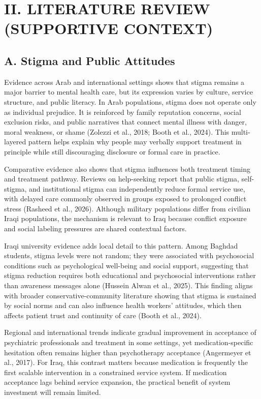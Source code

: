 \section{II. LITERATURE REVIEW (SUPPORTIVE
CONTEXT)}\label{ii.-literature-review-supportive-context}

\subsection{A. Stigma and Public
Attitudes}\label{a.-stigma-and-public-attitudes}

Evidence across Arab and international settings shows that stigma
remains a major barrier to mental health care, but its expression varies
by culture, service structure, and public literacy. In Arab populations,
stigma does not operate only as individual prejudice. It is reinforced
by family reputation concerns, social exclusion risks, and public
narratives that connect mental illness with danger, moral weakness, or
shame (Zolezzi et al., 2018; Booth et al., 2024). This multi-layered
pattern helps explain why people may verbally support treatment in
principle while still discouraging disclosure or formal care in
practice.

Comparative evidence also shows that stigma influences both treatment
timing and treatment pathway. Reviews on help-seeking report that public
stigma, self-stigma, and institutional stigma can independently reduce
formal service use, with delayed care commonly observed in groups
exposed to prolonged conflict stress (Rasheed et al., 2026). Although
military populations differ from civilian Iraqi populations, the
mechanism is relevant to Iraq because conflict exposure and social
labeling pressures are shared contextual factors.

Iraqi university evidence adds local detail to this pattern. Among
Baghdad students, stigma levels were not random; they were associated
with psychosocial conditions such as psychological well-being and social
support, suggesting that stigma reduction requires both educational and
psychosocial interventions rather than awareness messages alone (Hussein
Alwan et al., 2025). This finding aligns with broader
conservative-community literature showing that stigma is sustained by
social norms and can also influence health workers' attitudes, which
then affects patient trust and continuity of care (Booth et al., 2024).

Regional and international trends indicate gradual improvement in
acceptance of psychiatric professionals and treatment in some settings,
yet medication-specific hesitation often remains higher than
psychotherapy acceptance (Angermeyer et al., 2017). For Iraq, this
contrast matters because medication is frequently the first scalable
intervention in a constrained service system. If medication acceptance
lags behind service expansion, the practical benefit of system
investment will remain limited.

